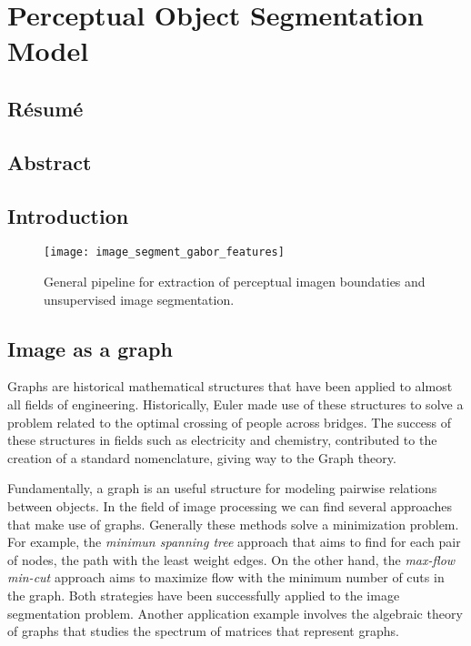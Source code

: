 
\chapter{Perceptual Object Segmentation Model}

\section*{Résumé}
\noindent 

\section*{Abstract}
\noindent 

\section{Introduction}


\begin{figure}[!ht]
	\centering
	\texttt{[image: image\_segment\_gabor\_features]}
	\caption{General pipeline for extraction of perceptual imagen boundaties and unsupervised image segmentation.}\label{fig:pipeline_gabor_image_segmentation}
\end{figure}


\section{Image as a graph}

Graphs are historical mathematical structures that have been applied to almost all fields of engineering. Historically, Euler made use of these structures to solve a problem related to the optimal crossing of people across bridges. The success of these structures in fields such as electricity and chemistry, contributed to the creation of a standard nomenclature, giving way to the Graph theory.

Fundamentally, a graph is an useful structure for modeling pairwise relations between objects. In the field of image processing we can find several approaches that make use of graphs. Generally these methods solve a minimization problem. For example, the \textit{minimun spanning tree} approach that aims to find for each pair of nodes, the path with the least weight edges. On the other hand, the \textit{max-flow min-cut} approach aims to maximize flow with the minimum number of cuts in the graph. Both strategies have been successfully applied to the image segmentation problem. Another application example involves the algebraic theory of graphs that studies the spectrum of matrices that represent graphs.

